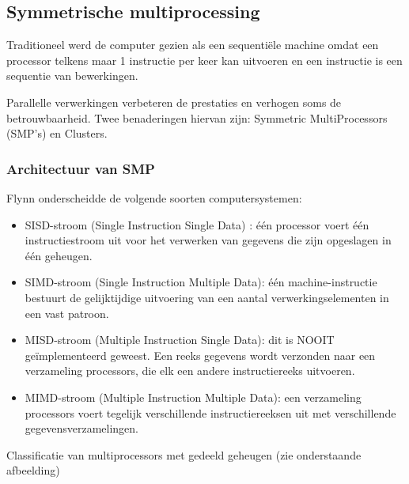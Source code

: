 \subsection{Symmetrische multiprocessing}

Traditioneel werd de computer gezien als een sequentiële machine omdat een processor telkens maar 1 instructie per keer kan uitvoeren en een instructie is een sequentie van bewerkingen.

Parallelle verwerkingen verbeteren de prestaties en verhogen soms de betrouwbaarheid. Twee benaderingen hiervan zijn: Symmetric MultiProcessors (SMP’s) en Clusters.


\subsubsection{Architectuur van SMP}

Flynn onderscheidde de volgende soorten computersystemen:

\begin{itemize}
\item SISD-stroom (Single Instruction Single Data) : één processor voert één instructiestroom uit voor het verwerken van gegevens die zijn opgeslagen in één geheugen.
\item SIMD-stroom (Single Instruction Multiple Data): één machine-instructie bestuurt de gelijktijdige uitvoering van een aantal verwerkingselementen in een vast patroon.
\item MISD-stroom (Multiple Instruction Single Data): dit is NOOIT geïmplementeerd geweest. Een reeks gegevens wordt verzonden naar een verzameling processors, die elk een andere instructiereeks uitvoeren.
\item MIMD-stroom (Multiple Instruction Multiple Data): een verzameling processors voert tegelijk verschillende instructiereeksen uit met verschillende gegevensverzamelingen.
\end{itemize}

\newpage

Classificatie van multiprocessors met gedeeld geheugen (zie onderstaande afbeelding)

